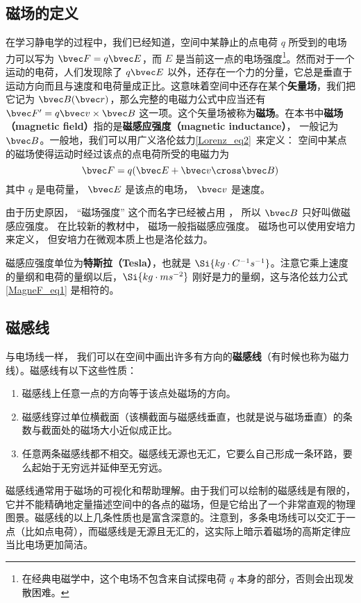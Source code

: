 
\subsection{磁场的定义}
在学习静电学的过程中，我们已经知道，空间中某静止的点电荷 $q$ 所受到的电场力可以写为 $\bvec F=q\bvec E$，而 $E$ 是当前这一点的电场强度\footnote{在经典电磁学中，这个电场不包含来自试探电荷 $q$ 本身的部分，否则会出现发散困难。}。然而对于一个运动的电荷，人们发现除了 $q\bvec E$ 以外，还存在一个力的分量，它总是垂直于运动方向而且与速度和电荷量成正比。这意味着空间中还存在某个\textbf{矢量场}，我们把它记为 $\bvec B(\bvec r)$，那么完整的电磁力公式中应当还有 $\bvec F'=q\bvec v\times \bvec B$ 这一项。这个矢量场被称为\textbf{磁场}。在本书中\textbf{磁场（magnetic field）}指的是\textbf{磁感应强度（magnetic inductance）}， 一般记为 $\bvec B$。一般地，我们可以用广义洛伦兹力\autoref{Lorenz_eq2}~来定义： 空间中某点的磁场使得运动时经过该点的点电荷所受的电磁力为
\begin{equation}\label{MagneF_eq1}
\bvec F = q(\bvec E + \bvec v \cross \bvec B)
\end{equation}
其中 $q$ 是电荷量， $\bvec E$ 是该点的电场， $\bvec v$ 是速度。

由于历史原因， “磁场强度” 这个而名字已经被占用%
， 所以 $\bvec B$ 只好叫做磁感应强度。 在比较新的教材中， 磁场一般指磁感应强度。 磁场也可以使用安培力来定义， 但安培力在微观本质上也是洛伦兹力。 


磁感应强度单位为\textbf{特斯拉（Tesla）}，也就是 $\Si{kg\cdot C^{-1}s^{-1}}$。注意它乘上速度的量纲和电荷的量纲以后，$\Si{kg\cdot ms^{-2}}$ 刚好是力的量纲，这与洛伦兹力公式\autoref{MagneF_eq1} 是相符的。
\subsection{磁感线}
与电场线一样， 我们可以在空间中画出许多有方向的\textbf{磁感线}（有时候也称为磁力线）。磁感线有以下这些性质：
\begin{enumerate}
\item 磁感线上任意一点的方向等于该点处磁场的方向。
\item 磁感线穿过单位横截面（该横截面与磁感线垂直，也就是说与磁场垂直）的条数与截面处的磁场大小近似成正比。
\item 任意两条磁感线都不相交。磁感线无源也无汇，它要么自己形成一条环路，要么起始于无穷远并延伸至无穷远。
\end{enumerate}
磁感线通常用于磁场的可视化和帮助理解。由于我们可以绘制的磁感线是有限的，它并不能精确地定量描述空间中的各点的磁场，但是它给出了一个非常直观的物理图景。磁感线的以上几条性质也是富含深意的。注意到，多条电场线可以交汇于一点（比如点电荷），而磁感线是无源且无汇的，这实际上暗示着磁场的高斯定律应当比电场更加简洁。


